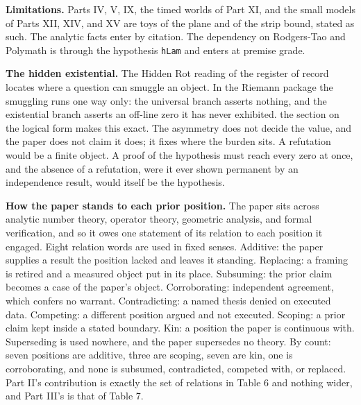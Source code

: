 \documentclass[10pt,twocolumn]{article}
\begin{document}
\textbf{Limitations.} Parts IV, V, IX, the timed worlds of Part XI, and
the small models of Parts XII, XIV, and XV are toys of the plane and of
the strip bound, stated as such. The analytic facts enter by citation.
The dependency on Rodgers-Tao and Polymath is through the hypothesis
\texttt{hLam} and enters at premise grade.

\textbf{The hidden existential.} The Hidden Rot reading of the register
of record locates where a question can smuggle an object. In the Riemann
package the smuggling runs one way only: the universal branch asserts
nothing, and the existential branch asserts an off-line zero it has
never exhibited. the section on the logical form makes this exact. The
asymmetry does not decide the value, and the paper does not claim it
does; it fixes where the burden sits. A refutation would be a finite
object. A proof of the hypothesis must reach every zero at once, and the
absence of a refutation, were it ever shown permanent by an independence
result, would itself be the hypothesis.

\textbf{How the paper stands to each prior position.} The paper sits
across analytic number theory, operator theory, geometric analysis, and
formal verification, and so it owes one statement of its relation to
each position it engaged. Eight relation words are used in fixed senses.
Additive: the paper supplies a result the position lacked and leaves it
standing. Replacing: a framing is retired and a measured object put in
its place. Subsuming: the prior claim becomes a case of the paper's
object. Corroborating: independent agreement, which confers no warrant.
Contradicting: a named thesis denied on executed data. Competing: a
different position argued and not executed. Scoping: a prior claim kept
inside a stated boundary. Kin: a position the paper is continuous with.
Superseding is used nowhere, and the paper supersedes no theory. By
count: seven positions are additive, three are scoping, seven are kin,
one is corroborating, and none is subsumed, contradicted, competed with,
or replaced. Part II's contribution is exactly the set of relations in
Table 6 and nothing wider, and Part III's is that of Table 7.
\end{document}
